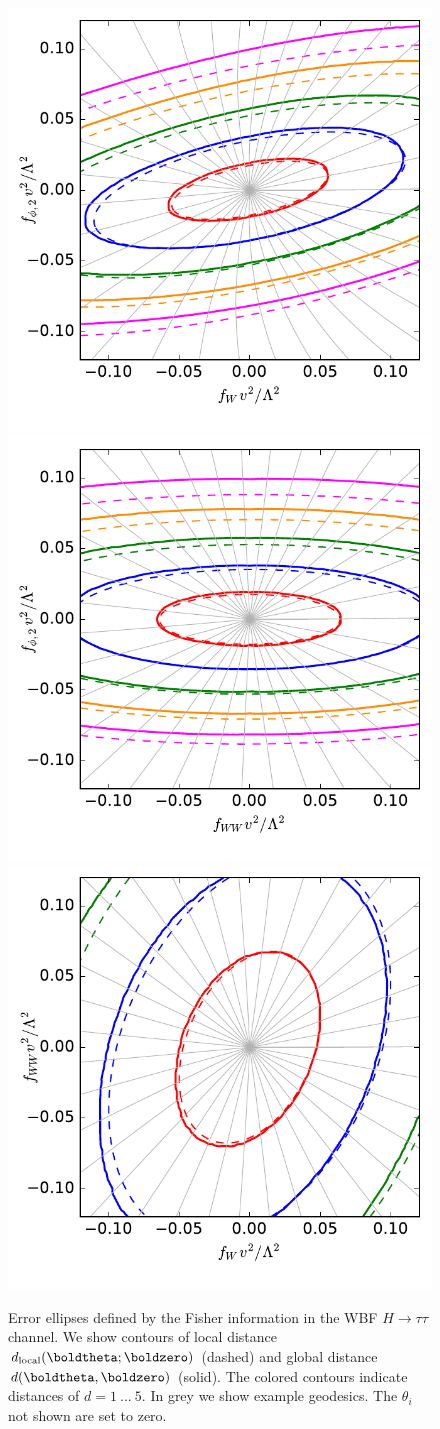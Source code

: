 \begin{figure}[b]
  \includegraphics[height=0.34 \textwidth,clip,trim=0.3cm 0 0.05cm 0]{fig/information/wbf_tautau_geometry_fphi2_fw}%
  \includegraphics[height=0.34 \textwidth,clip,trim=0.3cm 0 0.05cm 0]{fig/information/wbf_tautau_geometry_fphi2_fww}%
  \includegraphics[height=0.34 \textwidth,clip,trim=0.3cm 0 0.05cm 0]{fig/information/wbf_tautau_geometry_fww_fw}%
  \caption{Error ellipses defined by the Fisher information in the WBF
    $H \to \tau \tau$ channel. We show contours of local distance
    $d_\text{local}(\boldtheta ; \boldzero)$ (dashed) and global distance
    $d(\boldtheta,\boldzero)$ (solid).  The colored contours indicate
    distances of $d = 1~...~5$. In grey we show example geodesics. The
    $\theta_i$ not shown are set to zero. }
\label{fig:information_wbf_tautau_geometry}
\end{figure}


